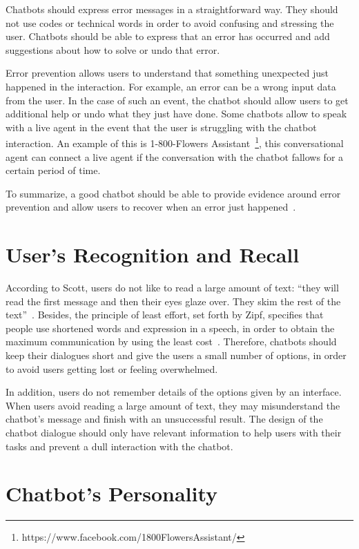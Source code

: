 \documentclass[a4paper,10pt]{article}
\begin{document}
Chatbots should express error messages in a straightforward way. They should not use codes or technical words in order to avoid confusing and stressing the user. Chatbots should be able to express that an error has occurred and add suggestions about how to solve or undo that error. 

Error prevention allows users to understand that something unexpected just happened in the interaction. For example, an error can be a wrong input data from the user. In the case of such an event, the chatbot should allow users to get additional help or undo what they just have done. Some chatbots  allow to speak with a live agent in the event that the user is struggling with the chatbot interaction. An example of this is 1-800-Flowers Assistant~\footnote{https://www.facebook.com/1800FlowersAssistant/}, this conversational agent can connect a live agent if the conversation with the chatbot fallows for a certain period of time. 

To summarize, a good chatbot should be able to provide evidence around error prevention and allow users to recover when an error just happened~\cite{HeuristicsWebPage}. 

\section{User's Recognition and Recall}

According to Scott, users do not like to read a large amount of text: ``they will read the first message and then their eyes glaze over. They skim the rest of the text”~\cite{HeuristicsWebPage}. Besides, the principle of least effort, set forth by Zipf, specifies that people use shortened words and expression in a speech, in order to obtain the maximum communication by using the least cost~\cite{zipf2016human}. Therefore, chatbots should keep their dialogues short and give the users a small number of options, in order to avoid users getting lost or feeling overwhelmed.

In addition, users do not remember details of the options given by an interface. When users avoid reading a large amount of text, they may misunderstand the chatbot’s message and finish with an unsuccessful result. The design of the chatbot dialogue should only have relevant information to help users with their tasks and prevent a dull interaction with the chatbot. 

\section{Chatbot's Personality}
\end{document}
